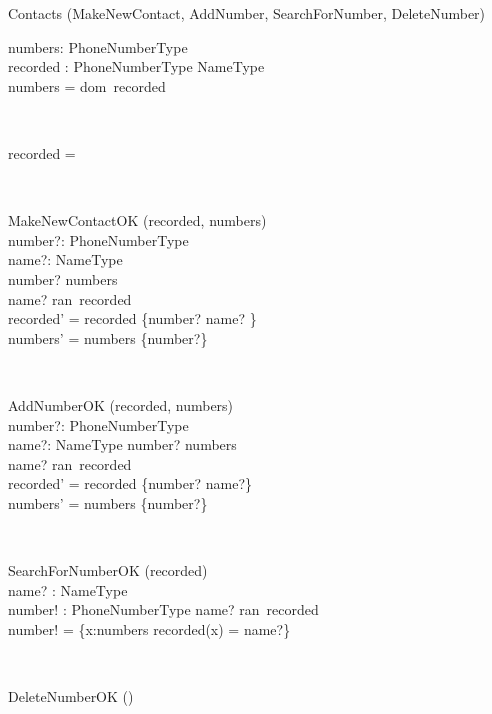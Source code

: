\begin{class}{Contacts}
\also
\upharpoonright (MakeNewContact, AddNumber, SearchForNumber, DeleteNumber) \\
\begin{state}
numbers:  PhoneNumberType\\
recorded : PhoneNumberType \pfun NameType\\
\where
numbers = dom~recorded
\end{state} \\
\begin{init}
recorded = \emptyset %
\end{init} \\
\begin{op}{MakeNewContactOK}
\Delta (recorded, numbers) \\
number?: PhoneNumberType \\
name?: NameType \\
\ST
number? \notin numbers \\
name? \notin ran~recorded \\
recorded' = recorded \cup \{number? \mapsto name? \}\\
numbers' = numbers \cup \{number?\} \\
\end{op}\\
\begin{op}{AddNumberOK}
\Delta (recorded, numbers) \\
number?: PhoneNumberType \\
name?: NameType
\ST
number? \notin numbers \\
name? \in ran~recorded \\
recorded' = recorded \cup \{number? \mapsto name?\} \\
numbers' = numbers \cup \{number?\} \\
\end{op}\\
\begin{op}{SearchForNumberOK}
    \Xi (recorded) \\
    name? : NameType\\
    number! :  PhoneNumberType
    \ST
    name? \in ran~recorded\\
    number! = \{x:numbers  \mid recorded(x) = name?\}
\end{op}\\
\begin{op}{DeleteNumberOK}
\Delta () \\

\end{op}
\end{class}
